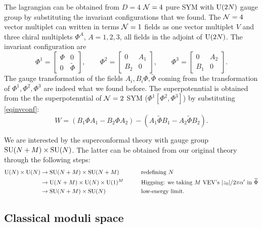         The lagrangian can be obtained from $D=4$ $\mathcal{N}=4$ pure SYM with $\text{U}(2N)$ gauge group by substituting the invariant configurations that we found. The $\mathcal{N}=4$ vector multiplet can written in terms $\mathcal{N}=1$ fields as one vector multiplet $V$ and three chiral multiplets $\Phi^A$, $A=1,2,3$, all fields in the adjoint of $\text{U}(2N)$. The invariant configuration are
        \begin{equation}
            \Phi^1=
            \begin{bmatrix}
                \Phi & 0 \\
                0 & \tilde{\Phi}
            \end{bmatrix},\qquad
            \Phi^2=
            \begin{bmatrix}
                0 & A_1 \\
                B_2 & 0
            \end{bmatrix},\qquad
            \Phi^3=
            \begin{bmatrix}
                0 & A_2 \\
                B_1 & 0
            \end{bmatrix}.\label{eqinvconf}
        \end{equation}
        The gauge transformation of the fields $A_i,B_i\Phi,\tilde{\Phi}$ coming from the transformation of $\Phi^1,\Phi^2,\Phi^3$ are indeed what we found before. The superpotenntial is obtained from the the superpotenntial of $\mathcal{N}=2$ SYM ($\Phi^1[\Phi^2,\Phi^3]$) by substituting \eqref{eqinvconf}:
        \begin{equation}
            W=(B_1\Phi A_1-B_2\Phi A_2)-(A_1\tilde{\Phi}B_1-A_2\tilde{\Phi}B_2).
        \end{equation}

        We are interested by the superconformal theory with gauge group $\text{SU}(N+M)\times\text{SU}(N)$. The latter can be obtained from our original theory through the following steps:
        \begin{alignat}{2}
            \text{U}(N)\times\text{U}(N)&\to \text{SU}(N+M)\times\text{SU}(N+M)\qquad&&\text{redefining $N$}\\
            &\to \text{U}(N+M)\times\text{U}(N)\times\text{U}(1)^M\qquad&&\text{Higgsing: we taking $M$ VEV's $\abs{z_0}/2\pi\alpha'$ in $\widetilde{\Phi}$}\\
            &\to \text{SU}(N+M)\times\text{SU}(N)\qquad&&\text{low-energy limit}.\label{eq:theorymanip}
        \end{alignat}


    \subsection{Classical moduli space}

